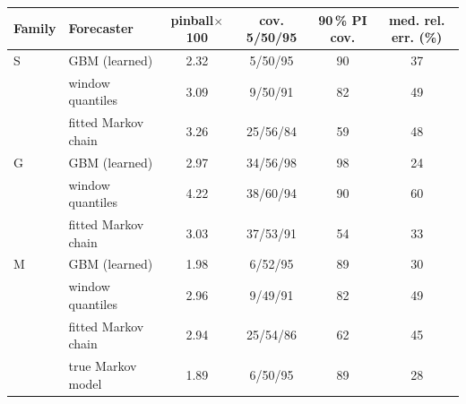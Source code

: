 \begin{tabular}{llcccc}
\hline
Family & Forecaster & pinball$\times$100 & cov. 5/50/95 & 90\,\% PI cov. & med. rel. err. (\%) \\
\hline
S & GBM (learned) & 2.32 & 5/50/95 & 90 & 37 \\
 & window quantiles & 3.09 & 9/50/91 & 82 & 49 \\
 & fitted Markov chain & 3.26 & 25/56/84 & 59 & 48 \\
\hline
G & GBM (learned) & 2.97 & 34/56/98 & 98 & 24 \\
 & window quantiles & 4.22 & 38/60/94 & 90 & 60 \\
 & fitted Markov chain & 3.03 & 37/53/91 & 54 & 33 \\
\hline
M & GBM (learned) & 1.98 & 6/52/95 & 89 & 30 \\
 & window quantiles & 2.96 & 9/49/91 & 82 & 49 \\
 & fitted Markov chain & 2.94 & 25/54/86 & 62 & 45 \\
 & true Markov model & 1.89 & 6/50/95 & 89 & 28 \\
\hline
\end{tabular}

